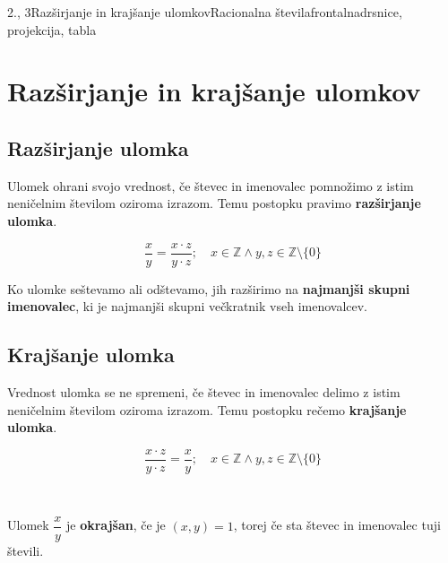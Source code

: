 \begin{priprava}{2., 3}{}{Razširjanje in krajšanje ulomkov}{Racionalna števila}{frontalna}{drsnice, projekcija, tabla}

    \section{Razširjanje in krajšanje ulomkov}

        

            \subsection*{Razširjanje ulomka}
                Ulomek ohrani svojo vrednost, če števec in imenovalec pomnožimo z istim neničelnim številom oziroma izrazom.
                Temu postopku pravimo \textbf{razširjanje ulomka}.

                $$\dfrac{x}{y}=\dfrac{x\cdot z}{y\cdot z}; \quad x\in\mathbb{Z} \land y,z\in\mathbb{Z}\setminus\{0\}$$
            

            
                Ko ulomke seštevamo ali odštevamo, jih razširimo na \textbf{najmanjši skupni imenovalec}, 
                ki je najmanjši skupni večkratnik vseh imenovalcev.
            

        

        
            \subsection*{Krajšanje ulomka}
                Vrednost ulomka se ne spremeni, če števec in imenovalec delimo z istim neničelnim številom oziroma izrazom.
                Temu postopku rečemo \textbf{krajšanje ulomka}.

                $$\dfrac{x\cdot z}{y\cdot z}=\dfrac{x}{y}; \quad x\in\mathbb{Z}\land y,z\in\mathbb{Z}\setminus\{0\} $$
            
                ~

                Ulomek $\dfrac{x}{y}$ je \textbf{okrajšan}, če je $(x,y)=1$, torej če sta števec in imenovalec tuji števili.
            
        
            ~\\



\end{priprava}
